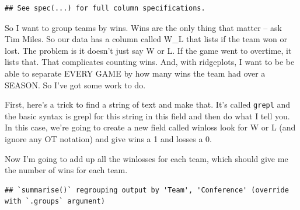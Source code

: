 \documentclass[
]{book}
\newenvironment{Shaded}{\begin{snugshade}}{\end{snugshade}}
\newcommand{\DataTypeTok}[1]{\textcolor[rgb]{0.13,0.29,0.53}{#1}}
\newcommand{\DecValTok}[1]{\textcolor[rgb]{0.00,0.00,0.81}{#1}}
\newcommand{\KeywordTok}[1]{\textcolor[rgb]{0.13,0.29,0.53}{\textbf{#1}}}
\newcommand{\NormalTok}[1]{#1}
\newcommand{\OperatorTok}[1]{\textcolor[rgb]{0.81,0.36,0.00}{\textbf{#1}}}
\newcommand{\StringTok}[1]{\textcolor[rgb]{0.31,0.60,0.02}{#1}}
\begin{document}
\begin{verbatim}
## See spec(...) for full column specifications.
\end{verbatim}

So I want to group teams by wins. Wins are the only thing that matter -- ask Tim Miles. So our data has a column called W\_L that lists if the team won or lost. The problem is it doesn't just say W or L. If the game went to overtime, it lists that. That complicates counting wins. And, with ridgeplots, I want to be be able to separate EVERY GAME by how many wins the team had over a SEASON. So I've got some work to do.

First, here's a trick to find a string of text and make that. It's called \texttt{grepl} and the basic syntax is grepl for this string in this field and then do what I tell you. In this case, we're going to create a new field called winloss look for W or L (and ignore any OT notation) and give wins a 1 and losses a 0.

\begin{Shaded}
\end{Shaded}

Now I'm going to add up all the winlosses for each team, which should give me the number of wins for each team.

\begin{Shaded}
\end{Shaded}

\begin{verbatim}
## `summarise()` regrouping output by 'Team', 'Conference' (override with `.groups` argument)
\end{verbatim}
\end{document}
